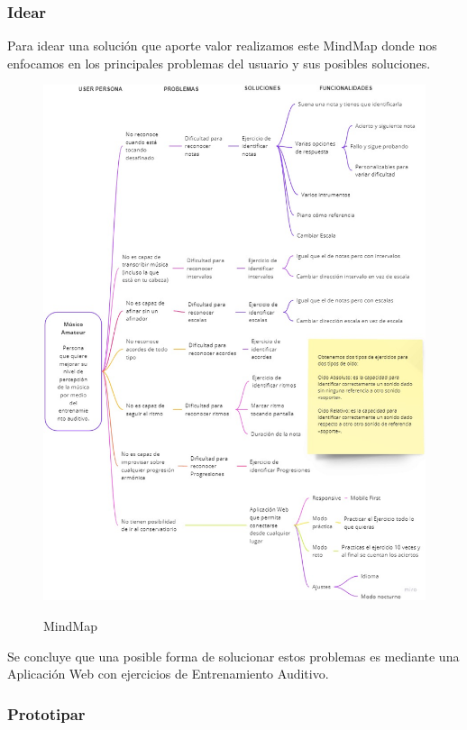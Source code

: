 \documentclass[12pt,twoside,titlepage]{report}
\begin{document}
\subsubsection{Idear}

Para idear una solución que aporte valor realizamos este MindMap donde nos enfocamos en los principales problemas del usuario y sus posibles soluciones.

\begin{figure}[H]
    \centering
    \includegraphics[scale=0.47]{Design Thinking/MindMap}
    \label{fig:Mindmap}
    \caption{MindMap}
\end{figure}

Se concluye que una posible forma de solucionar estos problemas es mediante una Aplicación Web con ejercicios de Entrenamiento Auditivo. 


\subsubsection{Prototipar}
\end{document}

